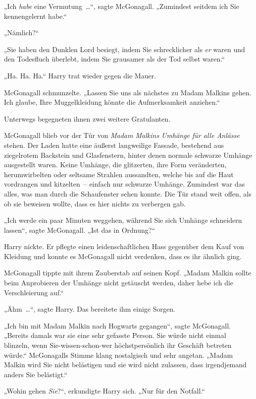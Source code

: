 „Ich \emph{habe} eine Vermutung …“, sagte McGonagall. „Zumindest seitdem ich Sie kennengelernt habe.“

„Nämlich?“

„Sie haben den Dunklen Lord besiegt, indem Sie schrecklicher als \emph{er} waren und den Todesfluch überlebt, indem Sie grausamer als der Tod selbst waren.“

„Ha. Ha. Ha.“ Harry trat wieder gegen die Mauer.

McGonagall schmunzelte. „Lassen Sie uns als nächstes zu Madam Malkins gehen. Ich glaube, Ihre Muggelkleidung könnte die Aufmerksamkeit anziehen.“

Unterwegs begegneten ihnen zwei weitere Gratulanten.

McGonagall blieb vor der Tür von \emph{Madam Malkins Umhänge für alle Anlässe} stehen. Der Laden hatte eine äußerst langweilige Fassade, bestehend aus ziegelrotem Backstein und Glasfenstern, hinter denen normale schwarze Umhänge ausgestellt waren. Keine Umhänge, die glitzerten, ihre Form veränderten, herumwirbelten oder seltsame Strahlen aussandten, welche bis auf die Haut vordrangen und kitzelten – einfach nur schwarze Umhänge. Zumindest war das alles, was man durch die Schaufenster sehen konnte. Die Tür stand weit offen, als ob sie beweisen wollte, dass es hier nichts zu verbergen gab.

„Ich werde ein paar Minuten weggehen, während Sie sich Umhänge schneidern lassen“, sagte McGonagall. „Ist das in Ordnung?“

Harry nickte. Er pflegte einen leidenschaftlichen Hass gegenüber dem Kauf von Kleidung und konnte es McGonagall nicht verdenken, dass es ihr ähnlich ging.

McGonagall tippte mit ihrem Zauberstab auf seinen Kopf. „Madam Malkin sollte beim Anprobieren der Umhänge nicht getäuscht werden, daher hebe ich die Verschleierung auf.“

„Ähm …“, sagte Harry. Das bereitete ihm einige Sorgen.

„Ich bin mit Madam Malkin nach Hogwarts gegangen“, sagte McGonagall. „Bereits damals war sie eine sehr gefasste Person. Sie würde nicht einmal blinzeln, wenn Sie-wissen-schon-wer höchstpersönlich ihr Geschäft betreten würde.“ McGonagalls Stimme klang nostalgisch und sehr angetan. „Madam Malkin wird Sie nicht belästigen und sie wird nicht zulassen, dass irgendjemand anders Sie belästigt.“

„Wohin gehen \emph{Sie}?“, erkundigte Harry sich. „Nur für den Notfall.“

